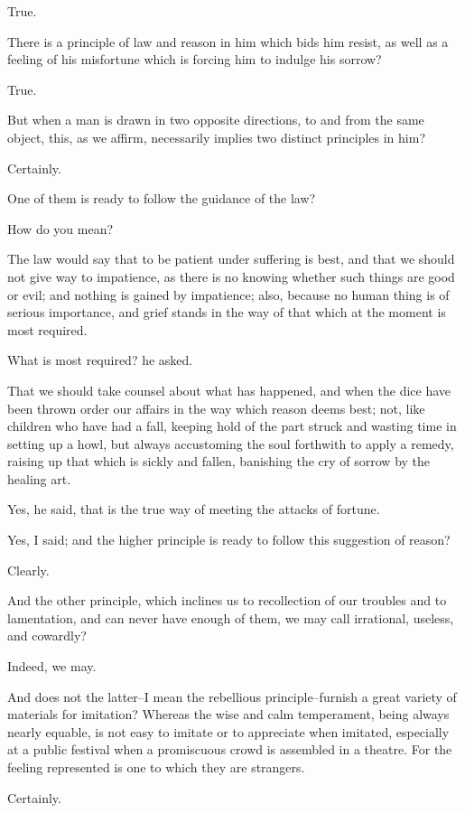 True.

There is a principle of law and reason in him which bids him resist, as
well as a feeling of his misfortune which is forcing him to indulge his
sorrow?

True.

But when a man is drawn in two opposite directions, to and from the same
object, this, as we affirm, necessarily implies two distinct principles
in him?

Certainly.

One of them is ready to follow the guidance of the law?

How do you mean?

The law would say that to be patient under suffering is best, and that
we should not give way to impatience, as there is no knowing whether
such things are good or evil; and nothing is gained by impatience; also,
because no human thing is of serious importance, and grief stands in the
way of that which at the moment is most required.

What is most required? he asked.

That we should take counsel about what has happened, and when the dice
have been thrown order our affairs in the way which reason deems best;
not, like children who have had a fall, keeping hold of the part struck
and wasting time in setting up a howl, but always accustoming the soul
forthwith to apply a remedy, raising up that which is sickly and fallen,
banishing the cry of sorrow by the healing art.

Yes, he said, that is the true way of meeting the attacks of fortune.

Yes, I said; and the higher principle is ready to follow this suggestion
of reason?

Clearly.

And the other principle, which inclines us to recollection of our
troubles and to lamentation, and can never have enough of them, we may
call irrational, useless, and cowardly?

Indeed, we may.

And does not the latter--I mean the rebellious principle--furnish a
great variety of materials for imitation? Whereas the wise and calm
temperament, being always nearly equable, is not easy to imitate or
to appreciate when imitated, especially at a public festival when a
promiscuous crowd is assembled in a theatre. For the feeling represented
is one to which they are strangers.

Certainly.

